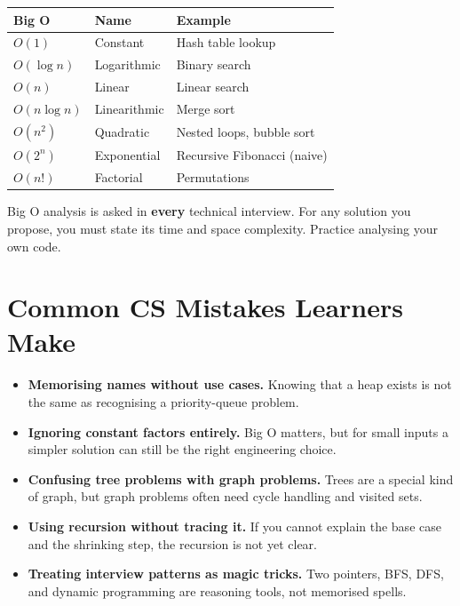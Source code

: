 \documentclass[12pt, a4paper, oneside]{book}
\begin{document}
\begin{center}
\begin{tabular}{l l l}
\toprule
\textbf{Big O} & \textbf{Name} & \textbf{Example} \\
\midrule
$O(1)$ & Constant & Hash table lookup \\
$O(\log n)$ & Logarithmic & Binary search \\
$O(n)$ & Linear & Linear search \\
$O(n \log n)$ & Linearithmic & Merge sort \\
$O(n^2)$ & Quadratic & Nested loops, bubble sort \\
$O(2^n)$ & Exponential & Recursive Fibonacci (naive) \\
$O(n!)$ & Factorial & Permutations \\
\bottomrule
\end{tabular}
\end{center}

\begin{interviewbox}
Big O analysis is asked in \textbf{every} technical interview. For any solution you propose, you must state its time and space complexity. Practice analysing your own code.
\end{interviewbox}

\section{Common CS Mistakes Learners Make}

\begin{itemize}[leftmargin=2em]
    \item \textbf{Memorising names without use cases.} Knowing that a heap exists is not the same as recognising a priority-queue problem.
    \item \textbf{Ignoring constant factors entirely.} Big O matters, but for small inputs a simpler solution can still be the right engineering choice.
    \item \textbf{Confusing tree problems with graph problems.} Trees are a special kind of graph, but graph problems often need cycle handling and visited sets.
    \item \textbf{Using recursion without tracing it.} If you cannot explain the base case and the shrinking step, the recursion is not yet clear.
    \item \textbf{Treating interview patterns as magic tricks.} Two pointers, BFS, DFS, and dynamic programming are reasoning tools, not memorised spells.
\end{itemize}
\end{document}
